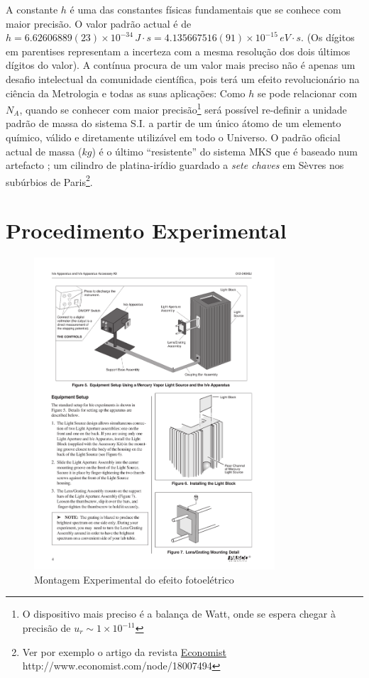 \documentclass[a4paper,12pt]{article}  %
\begin{document}
A constante $h$ é uma das constantes físicas fundamentais que se conhece com maior precisão.
O valor padrão actual é de $h=6.62606889(23) \times 10^{-34}\,J\cdot s=4.135667516(91)\times 10^{-15}\,eV\cdot s$. 
(Os  dígitos em parentises representam a incerteza com a mesma resolução dos dois últimos dígitos do valor). 
A contínua procura de um valor mais preciso não é apenas um  desafio intelectual da comunidade científica, pois
 terá um efeito  revolucionário na ciência da Metrologia e todas as suas aplicações: 
 Como $h$ se pode relacionar com $N_A$, quando se conhecer com maior precisão\footnote{O dispositivo mais preciso é a balança de Watt, onde se espera chegar à precisão de $u_r \sim 1\times 10^{-11}$} será possível re-definir a unidade padrão de massa do sistema S.I. a partir de um único átomo de um elemento químico, válido e diretamente utilizável em todo o Universo. 
 O padrão oficial actual de massa ($kg$) é o último ``resistente''  do sistema MKS que é baseado num artefacto	; 
 um cilindro de platina-irídio guardado a \emph{sete chaves} em Sèvres nos subúrbios de Paris\footnote{Ver por exemplo o artigo da revista \href{http://www.economist.com/node/18007494}{Economist} http://www.economist.com/node/18007494}.   
 
\section{\sf Procedimento Experimental}

\begin{figure}[htb] 
	\centering 
	\includegraphics[width=0.8\textwidth]{planckPasco} 
	\caption{Montagem Experimental do efeito fotoelétrico} 
	\label{fig:plackPasco}
\end{figure}
\end{document}
